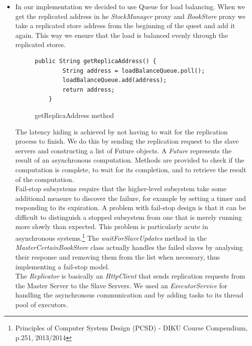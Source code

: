 \documentclass{article}      %
\begin{document}
\begin{itemize}
\item[1] In our implementation we decided to use Queue for load balancing. When we get the replicated address in he \emph{StockManager} proxy and \emph{BookStore} proxy we take a replicated store address from the beginning of the quest and add it again. This way we ensure that the load is balanced evenly through the replicated stores.\\

\begin{figure}[htbp]
\begin{center}
\begin{lstlisting}
public String getReplicaAddress() {
		String address = loadBalanceQueue.poll();
		loadBalanceQueue.add(address);
		return address;
	}
\end{lstlisting}
\caption{getReplicaAddress method}
\label{getReplicaAddress method}
\end{center}
\end{figure}

The latency hiding is achieved by not having to wait for the replication process to finish. We do this by sending the replication request to the slave servers and constructing a list of Future objects. A \emph{Future} represents the result of an asynchronous computation. Methods are provided to check if the computation is complete, to wait for its completion, and to retrieve the result of the computation. \\ 

Fail-stop subsystems require that the higher-level subsystem take some additional measure to discover the failure, for example by setting a timer and responding to its expiration. A problem with fail-stop design is that it can be difficult to distinguish a stopped subsystem from one that is merely running more slowly than expected. This problem is particularly acute in asynchronous systems.\footnote{Principles of Computer System Design (PCSD) - DIKU Course Compendium, p.251, 2013/2014} The \emph{waitForSlaveUpdates} method in the \emph{MasterCertainBookStore} class actually handles the failed slaves by analysing their response and removing them from the list when necessary, thus implementing a fail-stop model. \\ 

The \emph{Replicator} is basically an \emph{HttpClient} that sends replication requests  from the Master Server to the Slave Servers. We used an \emph{ExecutorService} for handling the asynchronous communication and by adding tasks to its thread pool of executors.\\


\end{itemize}
\end{document}
